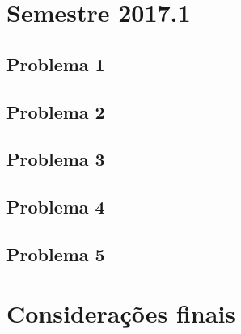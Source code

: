 \section{Semestre 2017.1}
\label{sec-sem-2017}
\subsection{Problema 1}
\subsection{Problema 2}
\subsection{Problema 3}
\subsection{Problema 4}
\subsection{Problema 5}
\section{Considerações finais}
\label{sec-consideracoes-resultados}
